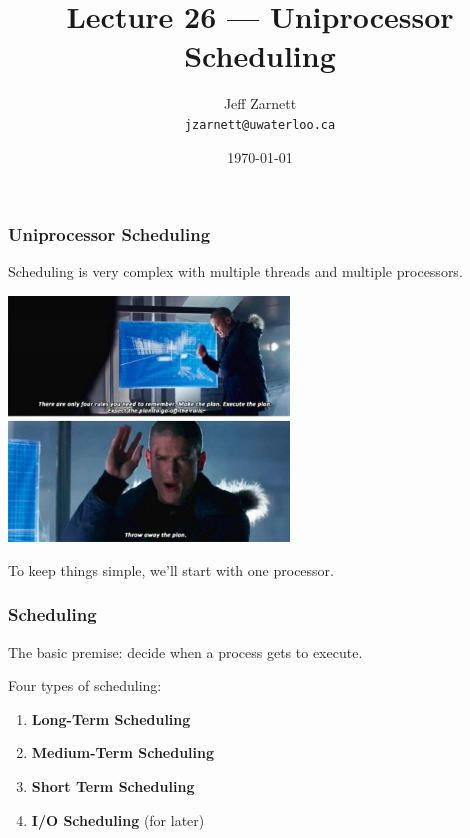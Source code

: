 

\title{Lecture 26 --- Uniprocessor Scheduling }

\author{Jeff Zarnett \\ \small \texttt{jzarnett@uwaterloo.ca}}
\date{\today}




\begin{frame}
  \titlepage

 \end{frame}



\begin{frame}
\frametitle{Uniprocessor Scheduling}

Scheduling is very complex with multiple threads and multiple processors.

\begin{center}
	\includegraphics[width=0.56\textwidth]{images/makeplan.jpg}
\end{center}

To keep things simple, we'll start with one processor.


\end{frame}


\begin{frame}
\frametitle{Scheduling}

The basic premise: decide when a process gets to execute. 

Four types of scheduling: 

\begin{enumerate}
	\item \textbf{Long-Term Scheduling}
	\item \textbf{Medium-Term Scheduling}
	\item \textbf{Short Term Scheduling}
	\item \textbf{I/O Scheduling} (for later)
\end{enumerate}

\end{frame}



